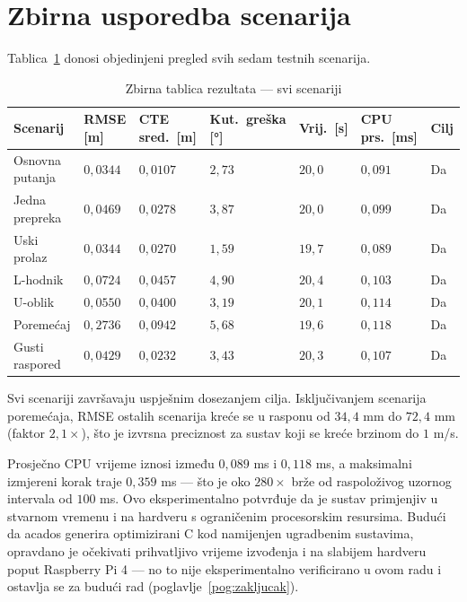 \FloatBarrier
\section{Zbirna usporedba scenarija}
\label{sec:r_summary}

Tablica~\ref{tab:summary} donosi objedinjeni pregled svih sedam testnih scenarija.

\begin{table}[H]
\centering
\caption{Zbirna tablica rezultata --- svi scenariji}
\label{tab:summary}
\small
\begin{tabular}{lllllll}
\toprule
Scenarij & RMSE [m] & CTE sred.\ [m] & Kut.\ greška [°] & Vrij.\ [s] & CPU prs.\ [ms] & Cilj \\
\midrule
Osnovna putanja   & $0{,}0344$ & $0{,}0107$ & $2{,}73$ & $20{,}0$ & $0{,}091$ & Da \\
Jedna prepreka    & $0{,}0469$ & $0{,}0278$ & $3{,}87$ & $20{,}0$ & $0{,}099$ & Da \\
Uski prolaz       & $0{,}0344$ & $0{,}0270$ & $1{,}59$ & $19{,}7$ & $0{,}089$ & Da \\
L-hodnik          & $0{,}0724$ & $0{,}0457$ & $4{,}90$ & $20{,}4$ & $0{,}103$ & Da \\
U-oblik           & $0{,}0550$ & $0{,}0400$ & $3{,}19$ & $20{,}1$ & $0{,}114$ & Da \\
Poremećaj         & $0{,}2736$ & $0{,}0942$ & $5{,}68$ & $19{,}6$ & $0{,}118$ & Da \\
Gusti raspored    & $0{,}0429$ & $0{,}0232$ & $3{,}43$ & $20{,}3$ & $0{,}107$ & Da \\
\bottomrule
\end{tabular}
\end{table}

Svi scenariji završavaju uspješnim dosezanjem cilja. Isključivanjem scenarija poremećaja, RMSE ostalih scenarija kreće se u rasponu od $34{,}4$ mm do $72{,}4$ mm (faktor $2{,}1\times$), što je izvrsna preciznost za sustav koji se kreće brzinom do $1$ m/s.

Prosječno CPU vrijeme iznosi između $0{,}089$ ms i $0{,}118$ ms, a maksimalni izmjereni korak traje $0{,}359$ ms --- što je oko $280\times$ brže od raspoloživog uzornog intervala od $100$ ms. Ovo eksperimentalno potvrđuje da je sustav primjenjiv u stvarnom vremenu i na hardveru s ograničenim procesorskim resursima. Budući da acados generira optimizirani C kod namijenjen ugradbenim sustavima, opravdano je očekivati prihvatljivo vrijeme izvođenja i na slabijem hardveru poput Raspberry Pi 4 --- no to nije eksperimentalno verificirano u ovom radu i ostavlja se za budući rad (poglavlje~\ref{pog:zakljucak}).


